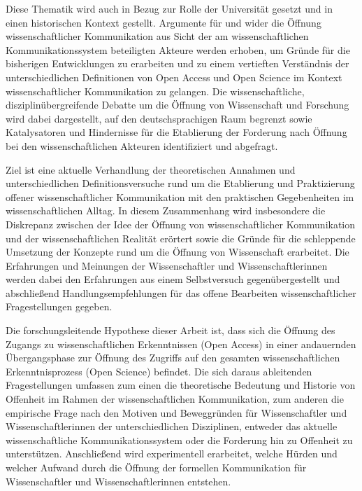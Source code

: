 Diese Thematik wird auch in Bezug zur Rolle der Universität gesetzt und in einen historischen Kontext gestellt. Argumente für und wider die Öffnung wissenschaftlicher Kommunikation aus Sicht der am wissenschaftlichen Kommunikationssystem beteiligten Akteure werden erhoben, um Gründe für die bisherigen Entwicklungen zu erarbeiten und zu einem vertieften Verständnis der unterschiedlichen Definitionen von Open Access und Open Science im Kontext wissenschaftlicher Kommunikation zu gelangen. Die wissenschaftliche, disziplinübergreifende Debatte um die Öffnung von Wissenschaft und Forschung wird dabei dargestellt, auf den deutschsprachigen Raum begrenzt sowie Katalysatoren und Hindernisse für die Etablierung der Forderung nach Öffnung bei den wissenschaftlichen Akteuren identifiziert und abgefragt.

Ziel ist eine aktuelle Verhandlung der theoretischen Annahmen und unterschiedlichen Definitionsversuche rund um die Etablierung und Praktizierung offener wissenschaftlicher Kommunikation mit den praktischen Gegebenheiten im wissenschaftlichen Alltag. In diesem Zusammenhang wird insbesondere die Diskrepanz zwischen der Idee der Öffnung von wissenschaftlicher Kommunikation und der wissenschaftlichen Realität \cite{Scheliga_2014} erörtert sowie die Gründe für die schleppende Umsetzung der Konzepte rund um die Öffnung von Wissenschaft erarbeitet. Die Erfahrungen und Meinungen der Wissenschaftler und Wissenschaftlerinnen werden dabei den Erfahrungen aus einem Selbstversuch gegenübergestellt und abschließend Handlungsempfehlungen für das offene Bearbeiten wissenschaftlicher Fragestellungen gegeben.

Die forschungsleitende Hypothese dieser Arbeit ist, dass sich die Öffnung des Zugangs zu wissenschaftlichen Erkenntnissen (Open Access) in einer andauernden Übergangsphase zur Öffnung des Zugriffs auf den gesamten wissenschaftlichen Erkenntnisprozess (Open Science) befindet. Die sich daraus ableitenden Fragestellungen umfassen zum einen die theoretische Bedeutung und Historie von Offenheit im Rahmen der wissenschaftlichen Kommunikation, zum anderen die empirische Frage nach den Motiven und Beweggründen für Wissenschaftler und Wissenschaftlerinnen der unterschiedlichen Disziplinen, entweder das aktuelle wissenschaftliche Kommunikationssystem oder die Forderung hin zu Offenheit zu unterstützen. Anschließend wird experimentell erarbeitet, welche Hürden und welcher Aufwand durch die Öffnung der formellen Kommunikation für Wissenschaftler und Wissenschaftlerinnen entstehen.

